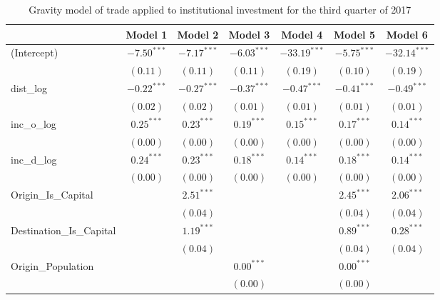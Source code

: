 \begin{table}
	\begin{center}
		\small
		\caption[Gravity Model of Trade for Q3 2017]{Gravity model of trade applied to institutional investment for the third quarter of 2017}
		\begin{tabular}{l c c c c c c }
			\hline
			& Model 1 & Model 2 & Model 3 & Model 4 & Model 5 & Model 6 \\
			\hline
			(Intercept)                  & $-7.50^{***}$ & $-7.17^{***}$ & $-6.03^{***}$ & $-33.19^{***}$ & $-5.75^{***}$ & $-32.14^{***}$ \\
			& $(0.11)$      & $(0.11)$      & $(0.11)$      & $(0.19)$       & $(0.10)$      & $(0.19)$       \\
			dist\_log                    & $-0.22^{***}$ & $-0.27^{***}$ & $-0.37^{***}$ & $-0.47^{***}$  & $-0.41^{***}$ & $-0.49^{***}$  \\
			& $(0.02)$      & $(0.02)$      & $(0.01)$      & $(0.01)$       & $(0.01)$      & $(0.01)$       \\
			inc\_o\_log                  & $0.25^{***}$  & $0.23^{***}$  & $0.19^{***}$  & $0.15^{***}$   & $0.17^{***}$  & $0.14^{***}$   \\
			& $(0.00)$      & $(0.00)$      & $(0.00)$      & $(0.00)$       & $(0.00)$      & $(0.00)$       \\
			inc\_d\_log                  & $0.24^{***}$  & $0.23^{***}$  & $0.18^{***}$  & $0.14^{***}$   & $0.18^{***}$  & $0.14^{***}$   \\
			& $(0.00)$      & $(0.00)$      & $(0.00)$      & $(0.00)$       & $(0.00)$      & $(0.00)$       \\
			Origin\_Is\_Capital          &               & $2.51^{***}$  &               &                & $2.45^{***}$  & $2.06^{***}$   \\
			&               & $(0.04)$      &               &                & $(0.04)$      & $(0.04)$       \\
			Destination\_Is\_Capital     &               & $1.19^{***}$  &               &                & $0.89^{***}$  & $0.28^{***}$   \\
			&               & $(0.04)$      &               &                & $(0.04)$      & $(0.04)$       \\
			Origin\_Population           &               &               & $0.00^{***}$  &                & $0.00^{***}$  &                \\
			&               &               & $(0.00)$      &                & $(0.00)$      &                \\

\end{tabular}
\end{center}
\end{table}
